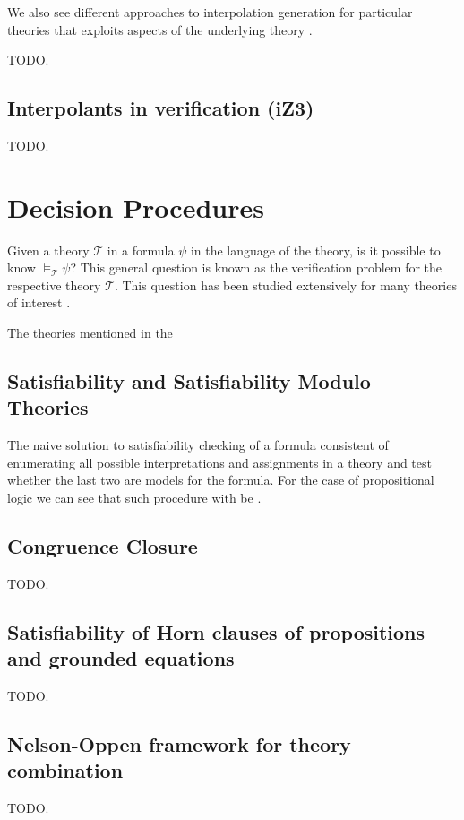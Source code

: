 We also see different approaches to interpolation generation for particular
theories that exploits aspects of the underlying theory
\cite{10.1007/978-3-540-69738-1_25, 10.1007/11814771_21}.

TODO.

\subsection{Interpolants in verification (iZ3)}


TODO.

\section{Decision Procedures}

Given a theory $\mathcal{T}$ in a formula $\psi$ in 
the language of the theory, is it possible to know $\models_{\mathcal{T}} \psi$? 
This general question is known as the verification problem for the respective
theory $\mathcal{T}$. This question has been studied extensively 
for many theories of interest \cite{börger2001classical}. 

The theories mentioned in the 

\subsection{Satisfiability and Satisfiability Modulo Theories}
 
The naive solution to satisfiability checking of a formula
consistent of enumerating all possible interpretations 
and assignments in a theory and test whether the last two are 
models for the formula. For the case of propositional logic 
we can see that such procedure with be .

\subsection{Congruence Closure}

TODO.

\subsection{Satisfiability of Horn clauses of propositions and grounded equations}

TODO.

\subsection{Nelson-Oppen framework for theory combination}


TODO.

